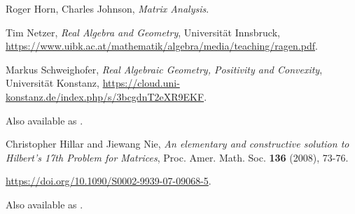 \documentclass{article}
\begin{document}
\begin{thebibliography}{999999}
    \raggedright\footnotesize

    Roger Horn, Charles Johnson, 
    \textit{Matrix Analysis}.

    Tim Netzer, 
    \textit{Real Algebra and Geometry}, 
    Universit\"at Innsbruck, 
    \url{https://www.uibk.ac.at/mathematik/algebra/media/teaching/ragen.pdf}.

    Markus Schweighofer, 
    \textit{Real Algebraic Geometry, Positivity and Convexity}, 
    Universit\"at Konstanz, 
    \url{https://cloud.uni-konstanz.de/index.php/s/3bcgdnT2eXR9EKF}.

    Also available as .

    Christopher Hillar and Jiewang Nie,
    \textit{An elementary and constructive solution to Hilbert's 17th Problem for Matrices},
    Proc. Amer. Math. Soc. \textbf{136} (2008), 73-76.

    \url{https://doi.org/10.1090/S0002-9939-07-09068-5}. 

    Also available as .
\end{thebibliography}
\end{document}
